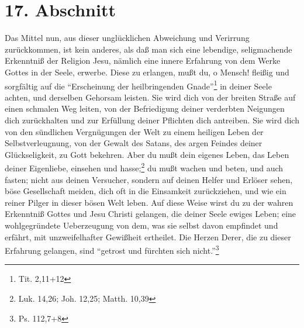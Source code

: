 \section{17. Abschnitt}

Das Mittel nun, aus dieser unglücklichen Abweichung und Verirrung zurückkommen,
ist kein anderes, als daß man sich eine lebendige, seligmachende Erkenntniß der
Religion Jesu, nämlich eine innere Erfahrung von dem Werke Gottes in der Seele,
erwerbe. Diese zu erlangen, mußt du, o Mensch! fleißig und sorgfältig auf die
"`Erscheinung der heilbringenden Gnade"'\footnote{Tit. 2,11+12} in deiner Seele
achten, und derselben Gehorsam leisten. Sie wird dich von der breiten Straße auf
einen schmalen Weg leiten, von der Befriedigung deiner verderbten Neigungen dich
zurückhalten und zur Erfüllung deiner Pflichten dich antreiben. Sie wird dich
von den sündlichen Vergnügungen der Welt zu einem heiligen Leben der
Selbstverleugnung, von der Gewalt des Satans, des argen Feindes deiner
Glückseligkeit, zu Gott bekehren. Aber du mußt dein eigenes Leben, das Leben
deiner Eigenliebe, einsehen und hasse;\footnote{Luk. 14,26; Joh. 12,25; Matth.
10,39} du mußt wachen und beten, und auch fasten; nicht aus deinen Versucher,
sondern auf deinen Helfer und Erlöser sehen, böse Gesellschaft meiden, dich oft
in die Einsamkeit zurückziehen, und wie ein reiner Pilger in dieser bösen Welt
leben. Auf diese Weise wirst du zu der wahren Erkenntniß Gottes und Jesu Christi
gelangen, die deiner Seele ewiges Leben; eine wohlgegründete Ueberzeugung von
dem, was sie selbst davon empfindet und erfährt, mit unzweifelhafter Gewißheit
ertheilet. Die Herzen Derer, die zu dieser Erfahrung gelangen, sind "`getrost
und fürchten sich nicht."'\footnote{Ps. 112,7+8}


